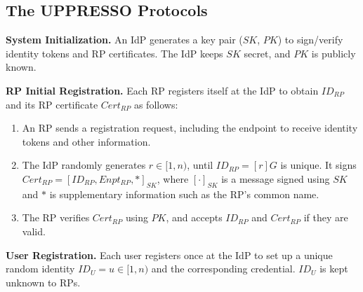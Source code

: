 \subsection{The UPPRESSO Protocols}
\label{implementations}

\noindent \textbf{System Initialization.}
An IdP generates a key pair ($SK$, $PK$) to sign/verify identity tokens and RP certificates.
The IdP keeps $SK$ secret, and $PK$ is publicly known.


\vspace{1mm}
\noindent\textbf{RP Initial Registration.}
Each RP registers itself at the IdP to obtain $ID_{RP}$
 and its RP certificate $Cert_{RP}$ as follows:
\vspace{-\topsep}\begin{enumerate}
\setlength{\topsep}{0pt}
\setlength{\partopsep}{0pt}
\setlength{\itemsep}{0pt}
\setlength{\parsep}{0pt}
\setlength{\parskip}{0pt}
\item
An RP sends a registration request, including the endpoint to receive identity tokens
    and other information.
\item
The IdP randomly generates $r \in [1,n)$, until $ID_{RP} = [r]G$ is unique.
It signs $Cert_{RP} = [ID_{RP}, Enpt_{RP}, *]_{SK}$,
     where $[\cdot]_{SK}$ is a message signed using $SK$ and $*$ is supplementary information such as the RP's common name.
\item
The RP verifies $Cert_{RP}$ using $PK$,
    and accepts $ID_{RP}$ and $Cert_{RP}$ if they are valid.
\end{enumerate}


\noindent\textbf{User Registration.}
Each user registers once at the IdP to set up a unique random identity $ID_U = u \in [1, n)$ and the corresponding credential. $ID_U$ is kept unknown to RPs.


